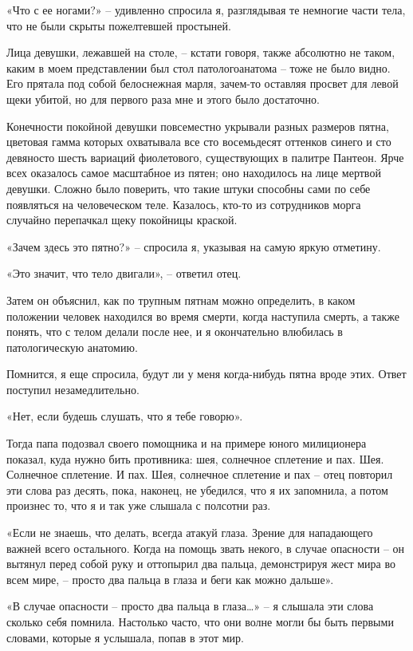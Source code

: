 \documentclass[
]{book}
\begin{document}
«Что с ее ногами?» -- удивленно спросила я, разглядывая те немногие части тела, что не были скрыты пожелтевшей простыней.

Лица девушки, лежавшей на столе, -- кстати говоря, также абсолютно не таком, каким в моем представлении был стол патологоанатома -- тоже не было видно. Его прятала под собой белоснежная марля, зачем-то оставляя просвет для левой щеки убитой, но для первого раза мне и этого было достаточно.

Конечности покойной девушки повсеместно укрывали разных размеров пятна, цветовая гамма которых охватывала все сто восемьдесят оттенков синего и сто девяносто шесть вариаций фиолетового, существующих в палитре Пантеон. Ярче всех оказалось самое масштабное из пятен; оно находилось на лице мертвой девушки. Сложно было поверить, что такие штуки способны сами по себе появляться на человеческом теле. Казалось, кто-то из сотрудников морга случайно перепачкал щеку покойницы краской.

«Зачем здесь это пятно?» -- спросила я, указывая на самую яркую отметину.

«Это значит, что тело двигали», -- ответил отец.

Затем он объяснил, как по трупным пятнам можно определить, в каком положении человек находился во время смерти, когда наступила смерть, а также понять, что с телом делали после нее, и я окончательно влюбилась в патологическую анатомию.

Помнится, я еще спросила, будут ли у меня когда-нибудь пятна вроде этих. Ответ поступил незамедлительно.

«Нет, если будешь слушать, что я тебе говорю».

Тогда папа подозвал своего помощника и на примере юного милиционера показал, куда нужно бить противника: шея, солнечное сплетение и пах. Шея. Солнечное сплетение. И пах. Шея, солнечное сплетение и пах -- отец повторил эти слова раз десять, пока, наконец, не убедился, что я их запомнила, а потом произнес то, что я и так уже слышала с полсотни раз.

«Если не знаешь, что делать, всегда атакуй глаза. Зрение для нападающего важней всего остального. Когда на помощь звать некого, в случае опасности -- он вытянул перед собой руку и оттопырил два пальца, демонстрируя жест мира во всем мире, -- просто два пальца в глаза и беги как можно дальше».

«В случае опасности -- просто два пальца в глаза\ldots» -- я слышала эти слова сколько себя помнила. Настолько часто, что они волне могли бы быть первыми словами, которые я услышала, попав в этот мир.
\end{document}
